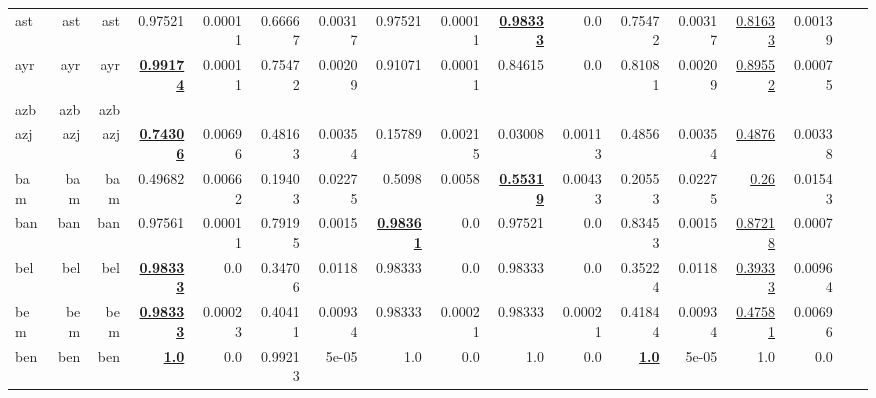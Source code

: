 \documentclass[11pt]{article}
\begin{document}
\begin{table*}[h]
{\begin{tabular}{lrrrrrrrrrrrrrrrr}
ast         & ast         & ast         & 0.97521         & 0.00011         & 0.66667         & 0.00317         & 0.97521         & 0.00011         & \textbf{\underline{0.98333}}         & 0.0         & 0.75472         & 0.00317         & \underline{0.81633}         & 0.00139         \\
ayr         & ayr         & ayr         & \textbf{\underline{0.99174}}         & 0.00011         & 0.75472         & 0.00209         & 0.91071         & 0.00011         & 0.84615         & 0.0         & 0.81081         & 0.00209         & \underline{0.89552}         & 0.00075         \\
azb         & azb         & azb         &         &          &          &          &         &          &         &          &          &          &          &          \\
azj         & azj         & azj         & \textbf{\underline{0.74306}}         & 0.00696         & 0.48163         & 0.00354         & 0.15789         & 0.00215         & 0.03008         & 0.00113         & 0.4856         & 0.00354         & \underline{0.4876}         & 0.00338         \\
bam         & bam         & bam         & 0.49682         & 0.00662         & 0.19403         & 0.02275         & 0.5098         & 0.0058         & \textbf{\underline{0.55319}}         & 0.00433         & 0.20553         & 0.02275         & \underline{0.26}         & 0.01543         \\
ban         & ban         & ban         & 0.97561         & 0.00011         & 0.79195         & 0.0015         & \textbf{\underline{0.98361}}         & 0.0         & 0.97521         & 0.0         & 0.83453         & 0.0015         & \underline{0.87218}         & 0.0007         \\
bel         & bel         & bel         & \textbf{\underline{0.98333}}         & 0.0         & 0.34706         & 0.0118         & 0.98333         & 0.0         & 0.98333         & 0.0         & 0.35224         & 0.0118         & \underline{0.39333}         & 0.00964         \\
bem         & bem         & bem         & \textbf{\underline{0.98333}}         & 0.00023         & 0.40411         & 0.00934         & 0.98333         & 0.00021         & 0.98333         & 0.00021         & 0.41844         & 0.00934         & \underline{0.47581}         & 0.00696         \\
ben         & ben         & ben         & \textbf{\underline{1.0}}         & 0.0         & 0.99213         & 5e-05         & 1.0         & 0.0         & 1.0         & 0.0         & \textbf{\underline{1.0}}         & 5e-05         & 1.0         & 0.0         \\

\end{tabular}}
\end{table*}
\end{document}

